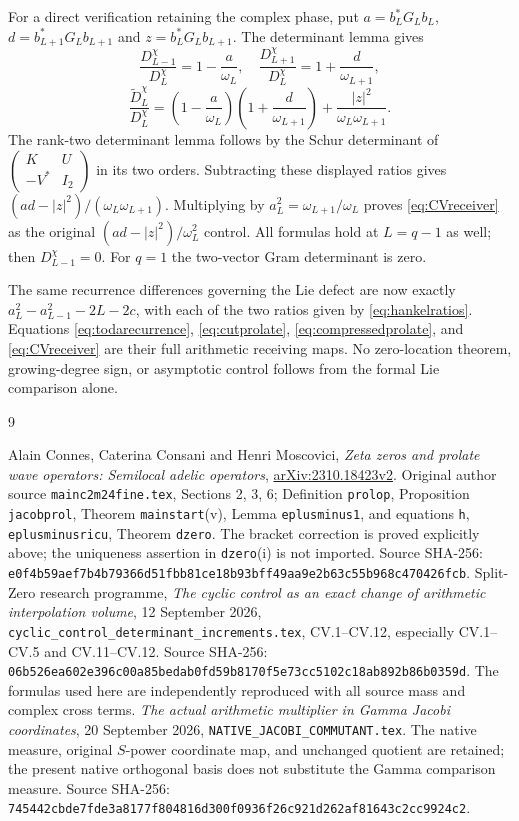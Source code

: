 \documentclass[11pt]{article}
\begin{document}
For a direct verification retaining the complex phase,
put $a=b_L^*G_Lb_L$, $d=b_{L+1}^*G_Lb_{L+1}$ and
$z=b_L^*G_Lb_{L+1}$. The determinant lemma gives
\[
 \frac{D_{L-1}^\chi}{D_L^\chi}=1-\frac a{\omega_L},
 \quad
 \frac{D_{L+1}^\chi}{D_L^\chi}=1+\frac d{\omega_{L+1}},
\]
\[
 \frac{\widetilde D_L^\chi}{D_L^\chi}
 =\left(1-\frac a{\omega_L}\right)
  \left(1+\frac d{\omega_{L+1}}\right)
                +\frac{|z|^2}{\omega_L\omega_{L+1}}.
\]
The rank-two determinant lemma follows by the
Schur determinant of
$\left(\begin{smallmatrix}K&U\\-V^*&I_2\end{smallmatrix}\right)$
in its two orders. Subtracting these displayed ratios
gives $(ad-|z|^2)/(\omega_L\omega_{L+1})$.
Multiplying by $a_L^2=\omega_{L+1}/\omega_L$
proves \eqref{eq:CVreceiver} as the original
$(ad-|z|^2)/\omega_L^2$ control. All formulas hold
at $L=q-1$ as well; then $D_{L-1}^\chi=0$.
For $q=1$ the two-vector Gram determinant is zero.

The same recurrence differences governing the Lie
defect are now exactly
$a_L^2-a_{L-1}^2-2L-2c$, with each of the two
ratios given by \eqref{eq:hankelratios}. Equations
\eqref{eq:todarecurrence}, \eqref{eq:cutprolate},
\eqref{eq:compressedprolate}, and \eqref{eq:CVreceiver}
are their full arithmetic receiving maps.
No zero-location theorem, growing-degree sign, or
asymptotic control follows from the formal Lie
comparison alone.

\begin{thebibliography}{9}\raggedright
{} Alain Connes, Caterina Consani and Henri Moscovici,
\emph{Zeta zeros and prolate wave operators: Semilocal adelic operators},
\href{https://arxiv.org/abs/2310.18423v2}{arXiv:2310.18423v2}.
Original author source \texttt{mainc2m24fine.tex}, Sections 2, 3, 6;
Definition \texttt{prolop}, Proposition \texttt{jacobprol},
Theorem \texttt{mainstart}(v), Lemma \texttt{eplusminus1},
and equations \texttt{h}, \texttt{eplusminusricu}, Theorem
\texttt{dzero}. The bracket correction is proved explicitly
above; the uniqueness assertion in \texttt{dzero}(i) is not
imported. Source SHA-256:
\texttt{e0f4b59aef7b4b79366d51fbb81ce18b93bff49aa9e2b63c55b968c470426fcb}.
 Split-Zero research programme,
\emph{The cyclic control as an exact change of arithmetic
interpolation volume}, 12 September 2026,
\texttt{cyclic\_control\_determinant\_increments.tex},
CV.1--CV.12, especially CV.1--CV.5 and CV.11--CV.12.
Source SHA-256:
\texttt{06b526ea602e396c00a85bedab0fd59b8170f5e73cc5102c18ab892b86b0359d}.
The formulas used here are independently reproduced
with all source mass and complex cross terms.
 \emph{The actual arithmetic multiplier in
Gamma Jacobi coordinates}, 20 September 2026,
\texttt{NATIVE\_JACOBI\_COMMUTANT.tex}. The native measure,
original $S$-power coordinate map, and unchanged quotient
are retained; the present native orthogonal basis does
not substitute the Gamma comparison measure.
Source SHA-256:
\texttt{745442cbde7fde3a8177f804816d300f0936f26c921d262af81643c2cc9924c2}.
\end{thebibliography}
\end{document}
